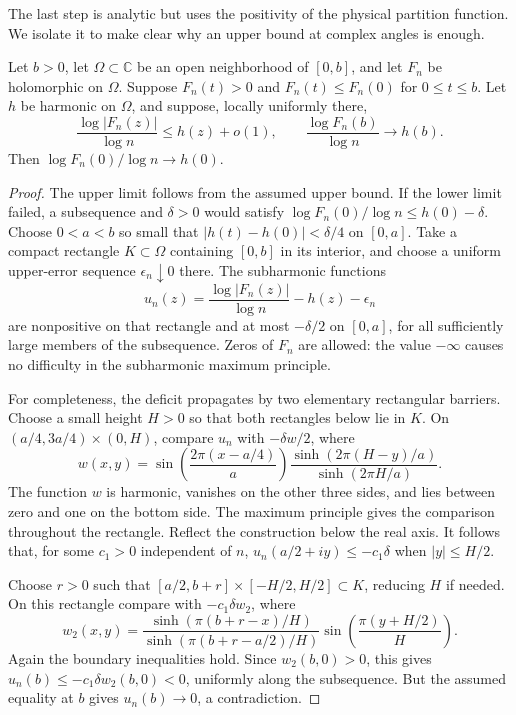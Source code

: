 The last step is analytic but uses the positivity of the physical
partition function. We isolate it to make clear why an upper bound at
complex angles is enough.

\begin{lemma}
\label{c2:lem-saturation}
Let \(b>0\), let \(\Omega\subset\mathbb C\) be an open neighborhood of
\([0,b]\), and let \(F_n\) be holomorphic on \(\Omega\). Suppose
\(F_n(t)>0\) and \(F_n(t)\le F_n(0)\) for \(0\le t\le b\). Let
\(h\) be harmonic on \(\Omega\), and suppose, locally uniformly there,
\[
 \frac{\log|F_n(z)|}{\log n}\le h(z)+o(1),\qquad
 \frac{\log F_n(b)}{\log n}\longrightarrow h(b).
\]
Then \(\log F_n(0)/\log n\longrightarrow h(0)\).
\end{lemma}

\begin{proof}
The upper limit follows from the assumed upper bound. If the lower limit
failed, a subsequence and \(\delta>0\) would satisfy
\(\log F_n(0)/\log n\le h(0)-\delta\). Choose \(0<a<b\) so small
that \(|h(t)-h(0)|<\delta/4\) on \([0,a]\). Take a compact rectangle \(K\subset\Omega\) containing
\([0,b]\) in its interior, and choose a uniform
upper-error sequence \(\epsilon_n\downarrow0\) there. The subharmonic
functions
\[
 u_n(z)=\frac{\log|F_n(z)|}{\log n}-h(z)-\epsilon_n
\]
are nonpositive on that rectangle and at most \(-\delta/2\) on
\([0,a]\), for all sufficiently large members of the subsequence.
Zeros of \(F_n\) are allowed: the value \(-\infty\) causes no difficulty
in the subharmonic maximum principle.

For completeness, the deficit propagates by two elementary rectangular
barriers. Choose a small height \(H>0\) so that both rectangles below
lie in \(K\). On
\((a/4,3a/4)\times(0,H)\), compare \(u_n\) with \(-\delta w/2\), where
\[
 w(x,y)=\sin\!\left(\frac{2\pi(x-a/4)}a\right)
 \frac{\sinh(2\pi(H-y)/a)}{\sinh(2\pi H/a)}.
\]
The function \(w\) is harmonic, vanishes on the other three sides,
and lies between zero and one on the bottom side. The maximum principle
gives the comparison throughout the rectangle. Reflect the construction
below the real axis. It follows that, for some \(c_1>0\) independent of
\(n\),
\(u_n(a/2+iy)\le-c_1\delta\) when \(|y|\le H/2\).

Choose \(r>0\) such that
\([a/2,b+r]\times[-H/2,H/2]\subset K\), reducing \(H\) if needed.
On this rectangle compare with \(-c_1\delta w_2\), where
\[
 w_2(x,y)=
 \frac{\sinh(\pi(b+r-x)/H)}{\sinh(\pi(b+r-a/2)/H)}
 \sin\!\left(\frac{\pi(y+H/2)}H\right).
\]
Again the boundary inequalities hold. Since \(w_2(b,0)>0\), this gives
\(u_n(b)\le-c_1\delta w_2(b,0)<0\), uniformly along the subsequence.
But the assumed equality at \(b\) gives \(u_n(b)\to0\), a contradiction.
\end{proof}

